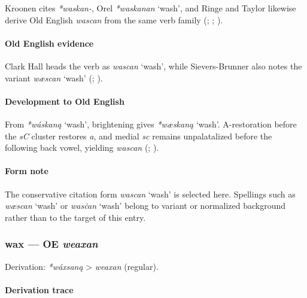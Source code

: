 \documentclass[
  british,
  a4paper,
]{article}
\providecommand{\Recon}[1]{\emph{*#1}}
\begin{document}
Kroonen cites \emph{*waskan-}, Orel \Recon{waskanan} `wash', and Ringe
and Taylor likewise derive Old English \emph{wascan} from the same verb
family (;
;
).

\paragraph{Old English evidence}\label{old-english-evidence-66}

Clark Hall heads the verb as \emph{wascan} `wash', while Sievers-Brunner
also notes the variant \emph{wæscan} `wash'
(;
).

\paragraph{Development to Old
English}\label{development-to-old-english-66}

From \Recon{wáskaną} `wash', brightening gives \Recon{wæskaną} `wash'.
A-restoration before the \emph{sC} cluster restores \emph{a}, and medial
\emph{sc} remains unpalatalized before the following back vowel,
yielding \emph{wascan} (;
).

\paragraph{Form note}\label{form-note-24}

The conservative citation form \emph{wascan} `wash' is selected here.
Spellings such as \emph{wæscan} `wash' or \emph{wasċan} `wash' belong to
variant or normalized background rather than to the target of this
entry.

\subsubsection{\texorpdfstring{wax --- OE
\emph{weaxan}}{wax --- OE weaxan}}\label{wax-oe-weaxan}

Derivation: \emph{*wáxsaną} \textgreater{} \emph{weaxan} (regular).

\paragraph{Derivation trace}\label{derivation-trace-71}
\end{document}
